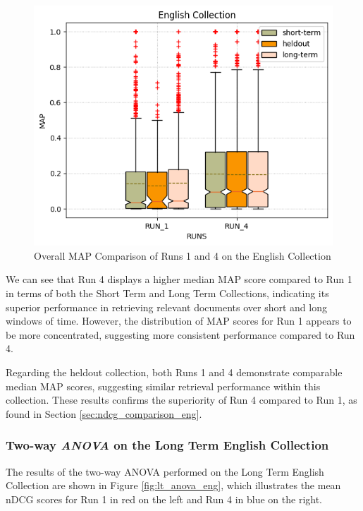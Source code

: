 \begin{figure}[!h]
\centering
\includegraphics[width=\linewidth]{figure/StatisticalAnalysis/BoxPlot/MAP English.png}
\caption{Overall \ac{MAP} Comparison of Runs 1 and 4 on the English Collection}
\label{fig:map_english}
\end{figure}

We can see that Run 4 displays a higher median \ac{MAP} score compared to Run 1 in terms of both the Short Term and Long Term Collections, indicating its superior performance in retrieving relevant documents over short and long windows of time. 
However, the distribution of \ac{MAP} scores for Run 1 appears to be more concentrated, suggesting more consistent performance compared to Run 4.

Regarding the heldout collection, both Runs 1 and 4 demonstrate comparable median \ac{MAP} scores, suggesting similar retrieval performance within this collection. 
These results confirms the superiority of Run 4 compared to Run 1, as found in Section \ref{sec:ndcg_comparison_eng}.

\subsubsection{Two-way \textit{ANOVA} on the Long Term English Collection}

The results of the two-way \ac{ANOVA} performed on the Long Term English Collection are shown in Figure \ref{fig:lt_anova_eng}, which illustrates the mean \ac{nDCG} scores for Run 1 in red on the left and Run 4 in blue on the right. 

